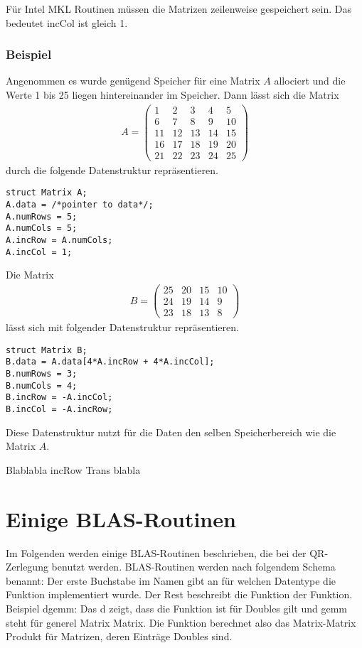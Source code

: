 Für Intel MKL Routinen müssen die Matrizen zeilenweise gespeichert sein.
Das bedeutet incCol ist gleich 1.

\subsubsection{Beispiel}
Angenommen es wurde genügend Speicher für eine Matrix $A$ allociert und die Werte 1 bis 25 liegen hintereinander im Speicher.
Dann lässt sich die Matrix
\begin{align*}
	A = \begin{pmatrix}
	 1 &  2 &  3 &  4 &  5 \\
	 6 &  7 &  8 &  9 & 10 \\
	11 & 12 & 13 & 14 & 15 \\
	16 & 17 & 18 & 19 & 20 \\
	21 & 22 & 23 & 24 & 25 
	\end{pmatrix}
\end{align*}
durch die folgende Datenstruktur repräsentieren.
\begin{lstlisting}
struct Matrix A;
A.data = /*pointer to data*/;
A.numRows = 5; 
A.numCols = 5;
A.incRow = A.numCols;
A.incCol = 1;
\end{lstlisting}
Die Matrix 
\begin{align*}
B = \begin{pmatrix}
25 &  20 &  15 & 10 \\
24 &  19 &  14 & 9 \\
23 &  18 &  13 & 8 
\end{pmatrix}
\end{align*}
lässt sich mit folgender Datenstruktur repräsentieren.
\begin{lstlisting}
struct Matrix B;
B.data = A.data[4*A.incRow + 4*A.incCol];
B.numRows = 3; 
B.numCols = 4;
B.incRow = -A.incCol;
B.incCol = -A.incRow;
\end{lstlisting}
Diese Datenstruktur nutzt für die Daten den selben Speicherbereich wie die Matrix $A$. 



Blablabla incRow Trans blabla


\newpage
\section{Einige BLAS-Routinen}
Im Folgenden werden einige BLAS-Routinen beschrieben, die bei der QR-Zerlegung benutzt werden.
BLAS-Routinen werden nach folgendem Schema benannt:
Der erste Buchstabe im Namen gibt an für welchen Datentype die Funktion implementiert wurde. Der Rest beschreibt die Funktion der Funktion.\\
Beispiel \glqq dgemm\grqq{}: Das \glqq d\grqq{} zeigt, dass die Funktion ist für Doubles gilt und  \glqq gemm\grqq{} steht für \glqq generel Matrix Matrix\grqq{}. Die  Funktion berechnet also das Matrix-Matrix Produkt für Matrizen, deren Einträge Doubles sind.

